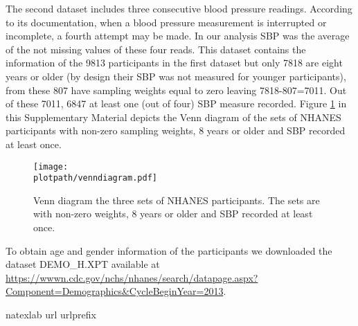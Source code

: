 \documentclass[]{imsart}
\newcommand\plotpath[1] {./#1}
\begin{document}
The second dataset includes three consecutive blood pressure readings. According to its documentation,
when a blood pressure measurement is interrupted or incomplete, a fourth attempt may be made.
In our analysis SBP was the average of the not missing values of these four reads.
This dataset contains the information of the 9813 participants in the first dataset but only
 7818 are eight years or older (by design their SBP was not measured for younger participants),
 from these 807 have sampling weights equal to zero
 leaving 7818-807=7011. Out of these 7011, 6847 at least one (out of four) SBP measure recorded.
 Figure \ref{fig:venndiagram} in this Supplementary Material depicts the Venn diagram of
the sets of NHANES participants with non-zero sampling weights, 8 years or older and SBP recorded at least once.
\begin{figure}%
\begin{center}
\texttt{[image: \\plotpath/venndiagram.pdf]} \\
\end{center}
\vskip-14mm
\caption{
\label{fig:venndiagram}
Venn diagram the three sets of NHANES participants. The sets are with non-zero weights, 8 years or older and SBP recorded at least once.
}
\end{figure}

To obtain age and gender information of the participants we downloaded the dataset
  DEMO\_H.XPT
  available at
  \url{https://wwwn.cdc.gov/nchs/nhanes/search/datapage.aspx?Component=Demographics&CycleBeginYear=2013}.
\setcounter{equation}{0}

\bibhang=1.7pc
\bibsep=2pt
\fontsize{9}{14pt plus.8pt minus .6pt}\selectfont
\renewcommand\bibname{\large \bf References}
\expandafter\ifx\csname
natexlab\endcsname\relax\def\natexlab#1{#1}\fi
\expandafter\ifx\csname url\endcsname\relax
  \def\url#1{\texttt{#1}}\fi
\expandafter\ifx\csname urlprefix\endcsname\relax\def\urlprefix{URL}\fi













\end{document}
